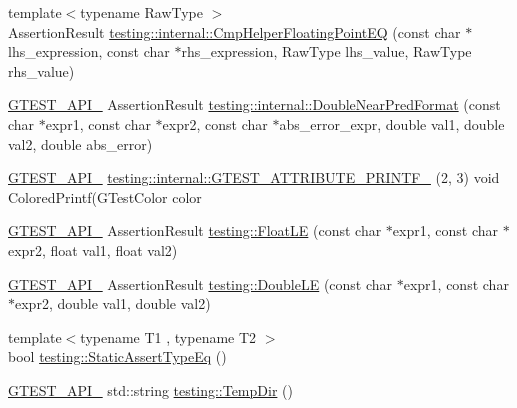 \begin{DoxyCompactItemize}
\item 
{\footnotesize template$<$typename Raw\+Type $>$ }\\Assertion\+Result \mbox{\hyperlink{namespacetesting_1_1internal_a98ce463e5dbe0c6120fa817e1f8f2944}{testing\+::internal\+::\+Cmp\+Helper\+Floating\+Point\+EQ}} (const char $\ast$lhs\+\_\+expression, const char $\ast$rhs\+\_\+expression, Raw\+Type lhs\+\_\+value, Raw\+Type rhs\+\_\+value)
\item 
\mbox{\hyperlink{_obj__test_2lib_2googletest-release-1_88_81_2googletest_2include_2gtest_2internal_2gtest-port_8h_aa73be6f0ba4a7456180a94904ce17790}{G\+T\+E\+S\+T\+\_\+\+A\+P\+I\+\_\+}} Assertion\+Result \mbox{\hyperlink{namespacetesting_1_1internal_a4f70b36c624b54c2362aeecc2f05ee8c}{testing\+::internal\+::\+Double\+Near\+Pred\+Format}} (const char $\ast$expr1, const char $\ast$expr2, const char $\ast$abs\+\_\+error\+\_\+expr, double val1, double val2, double abs\+\_\+error)
\item 
\mbox{\hyperlink{_obj__test_2lib_2googletest-release-1_88_81_2googletest_2include_2gtest_2internal_2gtest-port_8h_aa73be6f0ba4a7456180a94904ce17790}{G\+T\+E\+S\+T\+\_\+\+A\+P\+I\+\_\+}} \mbox{\hyperlink{namespacetesting_1_1internal_a5fd9f88035bd7f38979a2b15aead2bab}{testing\+::internal\+::\+G\+T\+E\+S\+T\+\_\+\+A\+T\+T\+R\+I\+B\+U\+T\+E\+\_\+\+P\+R\+I\+N\+T\+F\+\_\+}} (2, 3) void Colored\+Printf(G\+Test\+Color color
\item 
\mbox{\hyperlink{_obj__test_2lib_2googletest-release-1_88_81_2googletest_2include_2gtest_2internal_2gtest-port_8h_aa73be6f0ba4a7456180a94904ce17790}{G\+T\+E\+S\+T\+\_\+\+A\+P\+I\+\_\+}} Assertion\+Result \mbox{\hyperlink{namespacetesting_a2c9a2a391c72a7b02ea3024586e33af0}{testing\+::\+Float\+LE}} (const char $\ast$expr1, const char $\ast$expr2, float val1, float val2)
\item 
\mbox{\hyperlink{_obj__test_2lib_2googletest-release-1_88_81_2googletest_2include_2gtest_2internal_2gtest-port_8h_aa73be6f0ba4a7456180a94904ce17790}{G\+T\+E\+S\+T\+\_\+\+A\+P\+I\+\_\+}} Assertion\+Result \mbox{\hyperlink{namespacetesting_ae10e2bb304b74abd1b06a2d912a8b43b}{testing\+::\+Double\+LE}} (const char $\ast$expr1, const char $\ast$expr2, double val1, double val2)
\item 
{\footnotesize template$<$typename T1 , typename T2 $>$ }\\bool \mbox{\hyperlink{namespacetesting_a661e70fc6afeb5c085eed3716aa45059}{testing\+::\+Static\+Assert\+Type\+Eq}} ()
\item 
\mbox{\hyperlink{_obj__test_2lib_2googletest-release-1_88_81_2googletest_2include_2gtest_2internal_2gtest-port_8h_aa73be6f0ba4a7456180a94904ce17790}{G\+T\+E\+S\+T\+\_\+\+A\+P\+I\+\_\+}} std\+::string \mbox{\hyperlink{namespacetesting_aae1bbe7c3cc99bf56263d51d3982a52e}{testing\+::\+Temp\+Dir}} ()

\end{DoxyCompactItemize}

